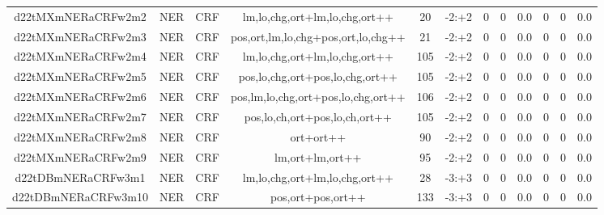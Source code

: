 \documentclass[a4paper]{article}
\begin{document}
\begin{landscape}
\begin{center}
\begin{tabular}{ |c|c|c|c|c|c|c|c|c|c|c|c|}
 
 	
 	\small{ d22tMXmNERaCRFw2m2 } & \small{ NER} & \small{  CRF }  & lm,lo,chg,ort+lm,lo,chg,ort++  &  20 &  \small{  -2:+2 }  &  0 & 0 & 0.0  &  0 & 0 & 0.0 \\
 	

 
 	
 	\small{ d22tMXmNERaCRFw2m3 } & \small{ NER} & \small{  CRF }  & pos,ort,lm,lo,chg+pos,ort,lo,chg++  &  21 &  \small{  -2:+2 }  &  0 & 0 & 0.0  &  0 & 0 & 0.0 \\
 	

 
 	
 	\small{ d22tMXmNERaCRFw2m4 } & \small{ NER} & \small{  CRF }  & lm,lo,chg,ort+lm,lo,chg,ort++  &  105 &  \small{  -2:+2 }  &  0 & 0 & 0.0  &  0 & 0 & 0.0 \\
 	

 
 	
 	\small{ d22tMXmNERaCRFw2m5 } & \small{ NER} & \small{  CRF }  & pos,lo,chg,ort+pos,lo,chg,ort++  &  105 &  \small{  -2:+2 }  &  0 & 0 & 0.0  &  0 & 0 & 0.0 \\
 	

 
 	
 	\small{ d22tMXmNERaCRFw2m6 } & \small{ NER} & \small{  CRF }  & pos,lm,lo,chg,ort+pos,lo,chg,ort++  &  106 &  \small{  -2:+2 }  &  0 & 0 & 0.0  &  0 & 0 & 0.0 \\
 	

 
 	
 	\small{ d22tMXmNERaCRFw2m7 } & \small{ NER} & \small{  CRF }  & pos,lo,ch,ort+pos,lo,ch,ort++  &  105 &  \small{  -2:+2 }  &  0 & 0 & 0.0  &  0 & 0 & 0.0 \\
 	

 
 	
 	\small{ d22tMXmNERaCRFw2m8 } & \small{ NER} & \small{  CRF }  & ort+ort++  &  90 &  \small{  -2:+2 }  &  0 & 0 & 0.0  &  0 & 0 & 0.0 \\
 	

 
 	
 	\small{ d22tMXmNERaCRFw2m9 } & \small{ NER} & \small{  CRF }  & lm,ort+lm,ort++  &  95 &  \small{  -2:+2 }  &  0 & 0 & 0.0  &  0 & 0 & 0.0 \\
 	

 
 	
 	\small{ d22tDBmNERaCRFw3m1 } & \small{ NER} & \small{  CRF }  & lm,lo,chg,ort+lm,lo,chg,ort++  &  28 &  \small{  -3:+3 }  &  0 & 0 & 0.0  &  0 & 0 & 0.0 \\
 	

 
 	
 	\small{ d22tDBmNERaCRFw3m10 } & \small{ NER} & \small{  CRF }  & pos,ort+pos,ort++  &  133 &  \small{  -3:+3 }  &  0 & 0 & 0.0  &  0 & 0 & 0.0 \\
 	


\end{tabular}
\end{center}
\end{landscape}
\end{document}
